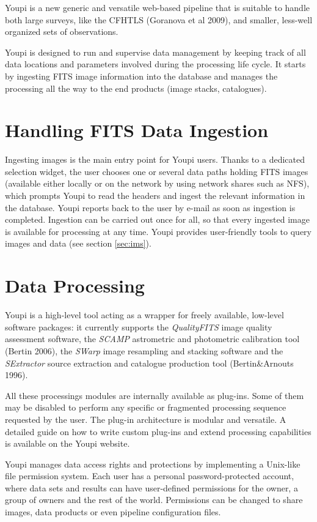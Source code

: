 \documentclass[11pt,twoside]{article}  %
\begin{document}
Youpi is a new generic and versatile web-based pipeline that is suitable to handle both large 
surveys, like the CFHTLS (Goranova et al 2009), and smaller, less-well organized sets of 
observations. 

Youpi is designed to run and supervise data management by keeping track of all data locations 
and parameters involved during the processing life cycle. It starts by ingesting FITS image
information into the database and manages the processing all the way to the end products (image stacks,
catalogues).

\section{Handling FITS Data Ingestion}

Ingesting images is the main entry point for Youpi users. Thanks to a dedicated selection widget,
the user chooses one or several data paths holding FITS images (available either locally or on
the network  by using network shares such as NFS), which prompts Youpi to read the headers and ingest 
the relevant information in the database. Youpi reports back to the user by e-mail as soon as
ingestion is completed. Ingestion can be carried out once for all, so that every ingested image
is available for processing at any time. Youpi provides user-friendly tools to query images and data
(see section \ref{sec:ims}). 

\section{Data Processing}

Youpi is a high-level tool acting as a wrapper for freely available, low-level software packages:
it currently supports the \emph{QualityFITS} image quality assessment software, the \emph{SCAMP}
astrometric and photometric calibration tool (Bertin 2006), the \emph{SWarp} image resampling
and stacking software and the \emph{SExtractor} source extraction and catalogue production tool
(Bertin\&Arnouts 1996).

All these processings modules are internally available as plug-ins. Some of them may be disabled 
to perform any specific or fragmented processing sequence requested by the user. The 
plug-in architecture is modular and versatile. A detailed guide on how to write custom plug-ins and
extend processing capabilities is available on the Youpi website.

Youpi manages data access rights and protections by implementing a Unix-like file permission system. 
Each user has a personal password-protected account, where data sets and results can have 
user-defined permissions for the owner, a group of owners and the rest of the world. Permissions
can be changed to share images, data products or even pipeline configuration files.
\end{document}
